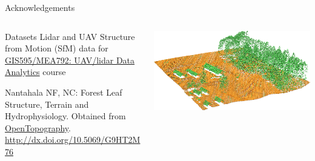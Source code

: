 \documentclass[xcolor={dvipsnames,usenames},beamer,aspectratio=169]{beamer}
\begin{document}
\begin{frame}{Acknowledgements}

\begin{columns}
\begin{column}{0.48\textwidth}

\begin{block}{Datasets}
\footnotesize
Lidar and UAV Structure from Motion (SfM) data for
\href{http://ncsu-osgeorel.github.io/uav-lidar-analytics-course/}%
  {GIS595/MEA792: UAV/lidar Data Analytics} course

\smallskip

Nantahala NF, NC: Forest Leaf Structure, Terrain and Hydrophysiology.
Obtained from \href{http://www.opentopography.org/}{OpenTopography}.
\url{http://dx.doi.org/10.5069/G9HT2M76}
\end{block}

\end{column}
\begin{column}{0.47\textwidth}

\begin{center}
  \includegraphics[width=\textwidth]{lidar_secref_3d}
\end{center}

\end{column}
\end{columns}

\end{frame}
\end{document}
